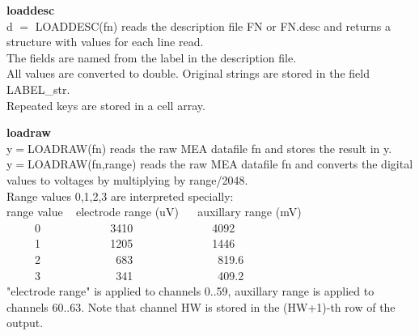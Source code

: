 \item {\bf loaddesc}\\
d {$=$} LOADDESC(fn) reads the description file FN or FN.desc 
and returns a structure with values for each line read. 
\\
The fields are named from the label in the description file.
\\
All values are converted to double. Original strings are stored in
the field LABEL\_str.
\\
Repeated keys are stored in a cell array.

\item {\bf loadraw}\\
y{$=$}LOADRAW(fn) reads the raw MEA datafile fn and stores the result in y.
\\
y{$=$}LOADRAW(fn,range) reads the raw MEA datafile fn and converts the
digital values to voltages by multiplying by range/2048. 
\\
Range values 0,1,2,3 are interpreted specially:
\\
range value ~ electrode range (uV) ~ ~auxillary range (mV)
\\
\mbox{~}\mbox{~}\mbox{~}\mbox{~}\mbox{~}0 ~ ~ ~ ~ ~ ~ ~ 3410 ~ ~ ~ ~ ~ ~ ~ ~ 4092
\\
\mbox{~}\mbox{~}\mbox{~}\mbox{~}\mbox{~}1 ~ ~ ~ ~ ~ ~ ~ 1205 ~ ~ ~ ~ ~ ~ ~ ~ 1446
\\
\mbox{~}\mbox{~}\mbox{~}\mbox{~}\mbox{~}2 ~ ~ ~ ~ ~ ~ ~ ~683 ~ ~ ~ ~ ~ ~ ~ ~ ~819.6
\\
\mbox{~}\mbox{~}\mbox{~}\mbox{~}\mbox{~}3 ~ ~ ~ ~ ~ ~ ~ ~341 ~ ~ ~ ~ ~ ~ ~ ~ ~409.2
\\
"electrode range" is applied to channels 0..59, auxillary range is
applied to channels 60..63. Note that channel HW is stored in the
(HW+1)-th row of the output.

